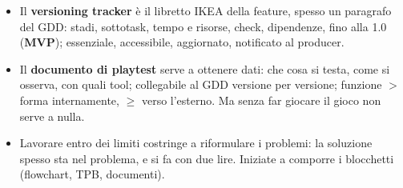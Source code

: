 \begin{itemize}
{        driven} (salvo i game as a service); non eliminate subito ciò che
        l'utenza odia: fermatevi e spacchettate.
  \item Il \textbf{versioning tracker} è il libretto IKEA della feature,
        spesso un paragrafo del GDD: stadi, sottotask, tempo e risorse,
        check, dipendenze, fino alla 1.0 (\textbf{MVP}); essenziale,
        accessibile, aggiornato, notificato al producer.
  \item Il \textbf{documento di playtest} serve a ottenere dati: che cosa si
        testa, come si osserva, con quali tool; collegabile al GDD versione
        per versione; funzione $>$ forma internamente, $\geq$ verso
        l'esterno. Ma senza far giocare il gioco non serve a nulla.
  \item Lavorare entro dei limiti costringe a riformulare i problemi: la
        soluzione spesso sta nel problema, e si fa con due lire. Iniziate a
        comporre i blocchetti (flowchart, TPB, documenti).
\end{itemize}
